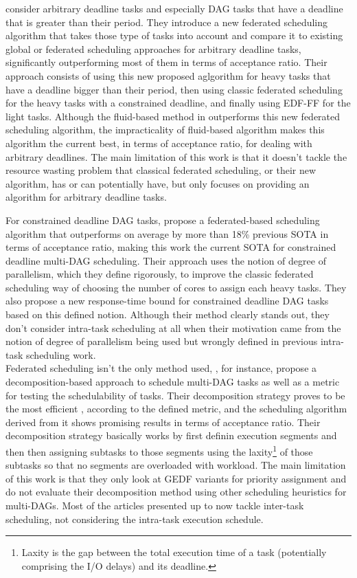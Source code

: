 \cite{Guan2023FederatedNew} 
consider arbitrary deadline tasks and especially
DAG tasks that have a deadline that is greater than their period.
They introduce a new federated scheduling algorithm 
that takes those type of tasks into account 
and compare it to existing global or federated scheduling approaches
for arbitrary deadline tasks, significantly outperforming
most of them in terms of acceptance ratio.
Their approach consists of using this new proposed aglgorithm 
for heavy tasks that have a deadline bigger than their period,
then using classic federated scheduling for the heavy tasks with a 
constrained deadline, and finally using EDF-FF for the light tasks.
Although the fluid-based method in \cite{GuanFluidDag2022}
outperforms this new federated scheduling algorithm,
the impracticality of fluid-based algorithm makes this algorithm
the current best, in terms of acceptance ratio, for dealing with arbitrary
deadlines. The main limitation of this work 
is that it doesn't tackle the resource wasting problem 
that classical federated scheduling, or their new algorithm, has or can potentially have, but only
focuses on providing an algorithm for arbitrary deadline tasks.

For constrained deadline DAG tasks, 
\cite{He2023DegreeOfParallelism} propose a federated-based
scheduling algorithm that outperforms on average by more than 18\%
previous SOTA\cite{Jiang2023SchedVirtualProcs} in terms of acceptance
ratio, making this work the current SOTA for constrained deadline multi-DAG scheduling.
Their approach uses the notion of degree of parallelism, which they 
define rigorously, to improve the classic federated scheduling way of 
choosing the number of cores to assign each heavy tasks.
They also propose a new response-time bound for constrained deadline DAG tasks
based on this defined notion.
Although their method clearly stands out,
they don't consider intra-task scheduling at all 
when their motivation came from the notion 
of degree of parallelism being used
but wrongly defined in previous intra-task scheduling work\cite{Zhao2022DAGsched}\cite{zhao2020DAGsched}.\\

Federated scheduling isn't the only method used,
\cite{JiangDecompoSchedParallelTask},
for instance, propose a decomposition-based 
approach to schedule multi-DAG tasks as well as 
a metric for testing the schedulability of tasks.
Their decomposition strategy proves to be the most efficient 
, according to the defined metric, and the scheduling algorithm
derived from it shows promising results in terms of
acceptance ratio.
Their decomposition strategy basically works by first 
definin execution segments and then then assigning subtasks 
to those segments using the laxity\footnote{Laxity is the gap between the total execution time of a task (potentially comprising the I/O delays) and its deadline.} of those subtasks so that 
no segments are overloaded with workload.
The main limitation of this work is that 
they only look at GEDF variants for priority assignment 
and do not evaluate their decomposition method
using other scheduling heuristics for multi-DAGs.
Most of the articles presented up to now 
tackle inter-task scheduling, not considering
the intra-task execution schedule.

